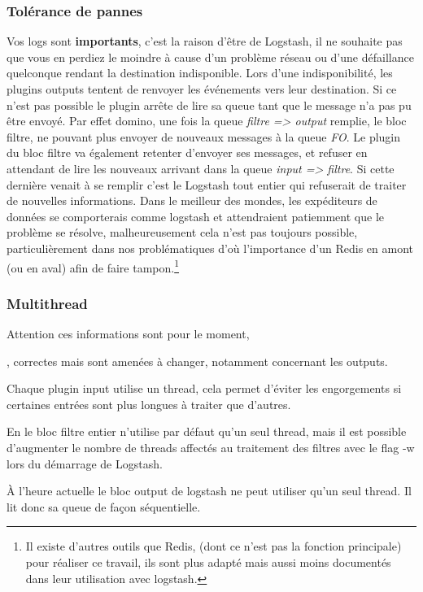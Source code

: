 \subsubsection{Tolérance de pannes}
Vos logs sont \textbf{importants}, c'est la raison d'être de Logstash, il ne souhaite 
pas que vous en perdiez le moindre à cause d'un problème réseau ou d'une défaillance
quelconque rendant la destination indisponible.
Lors d'une indisponibilité, les plugins outputs tentent de renvoyer les événements 
vers leur destination. Si ce n'est pas possible le plugin arrête de lire sa queue 
tant que le message n'a pas pu être envoyé. Par effet domino, une fois la queue 
\textit{filtre => output} remplie, le bloc filtre, ne pouvant plus envoyer de nouveaux 
messages à la queue \textit{FO}. Le plugin du bloc filtre va également retenter 
d'envoyer ses messages, et refuser en attendant de lire les nouveaux arrivant dans 
la queue \textit{input => filtre}.
Si cette dernière venait à se remplir c'est le Logstash tout entier qui refuserait de 
traiter de nouvelles informations. Dans le meilleur des mondes, les expéditeurs de
données se comporterais comme logstash et attendraient patiemment que le problème
se résolve, malheureusement cela n'est pas toujours possible, particulièrement dans
nos problématiques d'où l'importance d'un Redis en amont (ou en aval) afin de 
faire tampon.\footnote{Il existe d'autres outils que Redis, (dont ce n'est pas la fonction
principale) pour réaliser ce travail, ils sont plus adapté mais aussi moins documentés
dans leur utilisation avec logstash.}

\subsubsection{Multithread}
Attention ces informations sont pour le moment, \date{Jeudi 16 Avril}, correctes 
mais sont amenées à changer, notamment concernant les outputs.

Chaque plugin input utilise un \gls{thread}, cela permet d'éviter les engorgements si  
certaines entrées sont plus longues à traiter que d'autres.

En le bloc filtre entier n'utilise par défaut qu'un seul thread, mais il est possible 
d'augmenter le nombre de threads affectés au traitement des filtres avec le \gls{flag}
-w lors du démarrage de Logstash.

À l'heure actuelle le bloc output de logstash ne peut utiliser qu'un seul thread.
Il lit donc sa queue de façon séquentielle.


